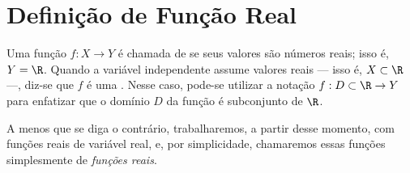 \section{Definição de Função Real}

\begin{definition}
    Uma função $f: X \to Y$ é chamada de  se seus valores são números reais; isso é, $Y = \R$.
    Quando a variável independente assume valores reais --- isso é, $X \subset \R$ ---, diz-se que $f$ é uma . Nesse caso, pode-se utilizar a notação $f:D\subset \R \to Y$ para enfatizar que o domínio $D$ da função é subconjunto de $\R$.
\end{definition}

A menos que se diga o contrário, trabalharemos, a partir desse momento, com funções reais de variável real, e, por simplicidade, chamaremos essas funções simplesmente de \emph{funções reais}. 